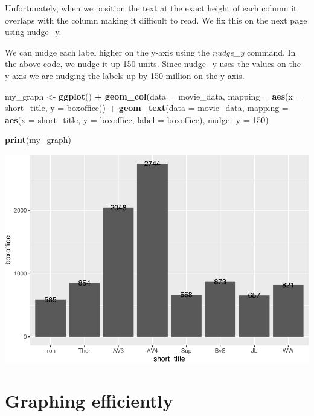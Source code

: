 \documentclass[
]{krantz}
\makeatletter
\newenvironment{Shaded}{\begin{snugshade}}{\end{snugshade}}
\newcommand{\DataTypeTok}[1]{\textcolor[rgb]{0.27,0.27,0.27}{#1}}
\newcommand{\DecValTok}[1]{\textcolor[rgb]{0.06,0.06,0.06}{#1}}
\newcommand{\KeywordTok}[1]{\textcolor[rgb]{0.27,0.27,0.27}{\textbf{#1}}}
\newcommand{\NormalTok}[1]{#1}
\newcommand{\OperatorTok}[1]{\textcolor[rgb]{0.43,0.43,0.43}{\textbf{#1}}}
\newcommand{\StringTok}[1]{\textcolor[rgb]{0.5,0.5,0.5}{#1}}
\newenvironment{kframe}{%
\medskip{}
\setlength{\fboxsep}{.8em}
 \def\at@end@of@kframe{}%
 \ifinner\ifhmode%
  \def\at@end@of@kframe{\end{minipage}}%
  \begin{minipage}{\columnwidth}%
 \fi\fi%
 \def\FrameCommand##1{\hskip\@totalleftmargin \hskip-\fboxsep
 \colorbox{shadecolor}{##1}\hskip-\fboxsep
     \hskip-\linewidth \hskip-\@totalleftmargin \hskip\columnwidth}%
 \MakeFramed {\advance\hsize-\width
   \@totalleftmargin\z@ \linewidth\hsize
   \@setminipage}}%
 {\par\unskip\endMakeFramed%
 \at@end@of@kframe}
\renewenvironment{Shaded}{\begin{kframe}}{\end{kframe}}
\makeatother
\begin{document}
Unfortunately, when we position the text at the exact height of each column it overlaps with the column making it difficult to read. We fix this on the next page using nudge\_y.

We can nudge each label higher on the y-axis using the \emph{nudge\_y} command. In the above code, we nudge it up 150 units. Since nudge\_y uses the values on the y-axis we are nudging the labels up by 150 million on the y-axis.

\begin{Shaded}
\begin{Highlighting}[]
\NormalTok{my_graph <-}\StringTok{ }\KeywordTok{ggplot}\NormalTok{() }\OperatorTok{+}
\StringTok{  }\KeywordTok{geom_col}\NormalTok{(}\DataTypeTok{data =}\NormalTok{ movie_data,}
           \DataTypeTok{mapping =} \KeywordTok{aes}\NormalTok{(}\DataTypeTok{x =}\NormalTok{ short_title, }
                         \DataTypeTok{y =}\NormalTok{ boxoffice)) }\OperatorTok{+}
\StringTok{  }\KeywordTok{geom_text}\NormalTok{(}\DataTypeTok{data =}\NormalTok{ movie_data, }
           \DataTypeTok{mapping =} \KeywordTok{aes}\NormalTok{(}\DataTypeTok{x =}\NormalTok{ short_title, }
                         \DataTypeTok{y =}\NormalTok{ boxoffice, }
                         \DataTypeTok{label =}\NormalTok{ boxoffice),}
           \DataTypeTok{nudge_y =} \DecValTok{150}\NormalTok{)}

\KeywordTok{print}\NormalTok{(my_graph)}
\end{Highlighting}
\end{Shaded}

\includegraphics[width=0.65\linewidth]{bookdown_files/figure-latex/unnamed-chunk-254-1}

\hypertarget{graphing-efficiently}{%
\section{Graphing efficiently}\label{graphing-efficiently}}
\end{document}
